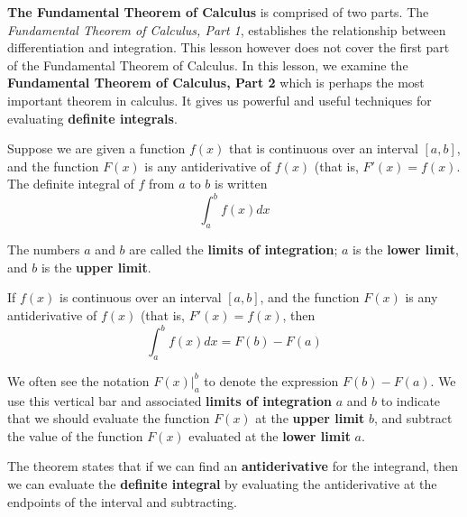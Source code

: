 \noindent \textbf{The Fundamental Theorem of Calculus} is comprised of two parts. The \emph{Fundamental Theorem of Calculus, Part 1}, establishes the relationship between differentiation and integration. This lesson however does not cover the first part of the Fundamental Theorem of Calculus\footnotemark. In this lesson,  we examine the \textbf{Fundamental Theorem of Calculus, Part 2} which is perhaps the most important theorem in calculus. It gives us powerful and useful techniques for evaluating  \textbf{definite integrals}. \\


\begin{tcolorbox}[title = {The Definite Integral and Its Notation}]
Suppose we are given a function $f(x)$ that is continuous over an interval $[a,b]$, and the function $F(x)$ is any antiderivative of $f(x)$ (that is, $F'(x)=f(x)$. The definite integral of $f$ from $a$ to $b$ is written
\begin{equation}
    \int_{a}^{b} f(x) dx
\end{equation}

The numbers $a$ and $b$ are called the \textbf{limits of integration}; $a$ is the \textbf{lower limit}, and $b$ is the \textbf{upper limit}.

\end{tcolorbox}

\begin{tcolorbox}[title = {The Fundamental Theorem of Calculus, Part 2 (also known as the evaluation theorem)}]
\noindent If $f(x)$ is continuous over an interval $[a,b]$, and the function $F(x)$ is any antiderivative of $f(x)$ (that is, $F'(x)=f(x)$, then 
\begin{equation}\label{eq:evaluationTheorem}
\int_{a}^{b} f(x) dx = F(b)-F(a)    
\end{equation}

\noindent We often see the notation $F(x)\big|_{a}^{b}$ to denote the expression $F(b)-F(a)$. We use this vertical bar and associated \textbf{limits of integration} $a$ and $b$ to indicate that we should evaluate the function $F(x)$ at the \textbf{upper limit} $b$, and subtract the value of the function $F(x)$ evaluated at the \textbf{lower limit} $a$.\\

\end{tcolorbox}
\noindent The theorem states that if we can find an \textbf{antiderivative} for the integrand, then we can evaluate the \textbf{definite integral} by evaluating the antiderivative at the endpoints of the interval and subtracting.

